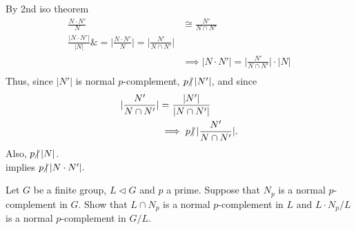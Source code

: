 \documentclass{article}
\begin{document}
\begin{homeworkProblem}
    By 2nd iso theorem 
    \begin{align}
        \frac{ N \cdot N' }{ N } &\cong \frac{ N' }{ N \cap N' }\\
        \frac{ \lvert N \cdot N'\rvert }{\lvert N \rvert} 
        \&= \lvert \frac{ N \cdot N' }{ N }\rvert
        = \lvert \frac{ N' }{ N \cap N' }\rvert \\
        &\implies \lvert N \cdot N' \rvert 
        = \lvert \frac{ N' }{ N \cap N' }\rvert \cdot \lvert N \rvert \\
    \end{align}
    Thus, since $\lvert N'\rvert$ is normal $p$-complement, 
    $p \hspace{-4pt}\not| \hspace{2pt} \lvert N' \rvert$, and since
    \begin{align}
        \lvert \frac{ N' }{ N \cap N' }\rvert &= \frac{ \lvert N' \rvert }{ \lvert N \cap N' \rvert }\\
        &\implies p \hspace{-4pt}\not| \hspace{2pt} \lvert \frac{ N' }{ N \cap N' }\rvert.
    \end{align}
    Also, $p \hspace{-4pt}\not| \hspace{2pt} \lvert N \rvert$.\\
    implies $p \hspace{-4pt}\not| \hspace{2pt} \lvert N \cdot N' \rvert.$\\


    
    
    

    




\end{homeworkProblem}

\pagebreak


\begin{homeworkProblem}
    Let $G$ be a finite group, $L \lhd G$ and $p$ a prime.
    Suppose that $N_p$ is a normal $p$-complement in $G$.
    Show that $L \cap N_p$ is a normal $p$-complement in $L$
    and $L \cdot N_p / L$ is a normal $p$-complement in $G/L$.\\
    \solution 
    

\end{homeworkProblem}

\pagebreak
\end{document}
